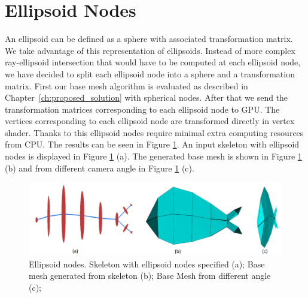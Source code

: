 \section{Ellipsoid Nodes}
An ellipsoid can be defined as a sphere with associated transformation matrix.
We take advantage of this representation of ellipsoids.
Instead of more complex ray-ellipsoid intersection that would have to be computed at each ellipsoid node, we have decided to split each ellipsoid node into a sphere and a transformation matrix.
First our base mesh algorithm is evaluated as described in Chapter~\ref{ch:proposed_solution} with spherical nodes.
After that we send the transformation matrices corresponding to each ellipsoid node to GPU.
The vertices corresponding to each ellipsoid node are transformed directly in vertex shader.
Thanks to this ellipsoid nodes require minimal extra computing resources from CPU.
The results can be seen in Figure \ref{fig:ellipsoid_ilu}.
An input skeleton with ellipsoid nodes is displayed in Figure \ref{fig:ellipsoid_ilu} (a).
The generated base mesh is shown in Figure \ref{fig:ellipsoid_ilu} (b) and from different camera angle in Figure \ref{fig:ellipsoid_ilu} (c).

\begin{figure}[ht]
    \centering
    \includegraphics[width=\linewidth]{images/ellipsoid_fish_ilu}
    \caption[Ellipsoid nodes]{Ellipsoid nodes. Skeleton with ellipsoid nodes specified (a); Base mesh generated from skeleton (b); Base Mesh from different angle (c);}
    \label{fig:ellipsoid_ilu}
\end{figure}

